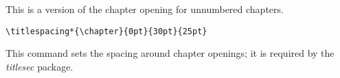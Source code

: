 \vspace*{-6pt} \noindent
This is a version of the chapter opening for unnumbered chapters.



\begin{verbatim}
\titlespacing*{\chapter}{0pt}{30pt}{25pt}
\end{verbatim}

\vspace*{-6pt} \noindent
This command sets the spacing around chapter openings; it is required by the
\emph{titlesec} package.
